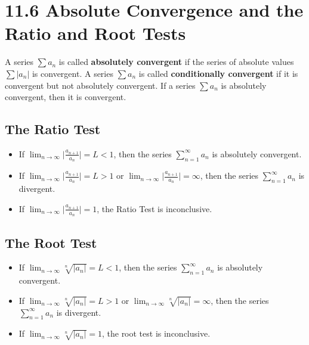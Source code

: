 %
%

\section*{11.6 Absolute Convergence and the Ratio and Root Tests}

A series \(\sum{a_n}\) is called \textbf{absolutely convergent} if the series of
absolute values \(\sum{|a_n|}\) is convergent.
\newline
A series \(\sum{a_n}\) is called \textbf{conditionally convergent} if it is
convergent but not absolutely convergent.
\newline
If a series \(\sum{a_n}\) is absolutely convergent, then it is convergent. 

\subsection*{The Ratio Test}

\begin{itemize}
    \item If \(\lim_{n \to \infty}{\big|\frac{a_{n+1}}{a_n}\big|}=L<1\), then
the series \(\sum_{n=1}^{\infty}{a_n}\) is absolutely convergent.
    \item If \(\lim_{n \to \infty}{\big|\frac{a_{n+1}}{a_n}\big|}=L>1\) or
\(\lim_{n \to \infty}{\big|\frac{a_{n+1}}{a_n}\big|}=\infty\), then the series
\(\sum_{n=1}^{\infty}{a_n}\) is divergent.
    \item If \(\lim_{n \to \infty}{\big|\frac{a_{n+1}}{a_n}\big|}=1\), the Ratio
Test is inconclusive.
\end{itemize}

\subsection*{The Root Test}

\begin{itemize}
    \item If \(\lim_{n \to \infty}{\sqrt[n]{|a_n|}} = L < 1\), then the series
\(\sum_{n=1}^{\infty}{a_n}\) is absolutely convergent.
    \item If \(\lim_{n \to \infty}{\sqrt[n]{|a_n|}} = L > 1\) or \(\lim_{n \to
\infty}{\sqrt[n]{|a_n|}} = \infty\), then the series
\(\sum_{n=1}^{\infty}{a_n}\) is divergent.
    \item If \(\lim_{n \to \infty}{\sqrt[n]{|a_n|}} = 1\), the root test is
inconclusive.
\end{itemize}
